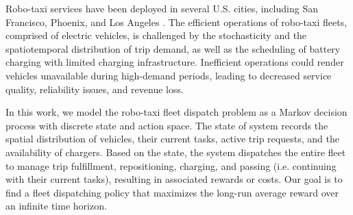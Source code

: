 Robo-taxi services have been deployed in several U.S. cities, including San Francisco, Phoenix, and Los Angeles \citep{robotaxi_news}. The efficient operations of robo-taxi fleets, comprised of electric vehicles, is challenged by the stochasticity and the spatiotemporal distribution of trip demand, as well as the scheduling of battery charging with limited charging infrastructure. Inefficient operations could render vehicles unavailable during high-demand periods, leading to decreased service quality, reliability issues, and revenue loss. %

In this work, we model the robo-taxi fleet dispatch problem as a Markov decision process with discrete state and action space. The state of system records the spatial distribution of vehicles, their current tasks, active trip requests, and the availability of chargers. Based on the state, the system dispatches the entire fleet to manage trip fulfillment, repositioning, charging, and passing (i.e. continuing with their current tasks), resulting in associated rewards or costs. Our goal is to find a fleet dispatching policy that maximizes the long-run average reward over an infinite time horizon.

